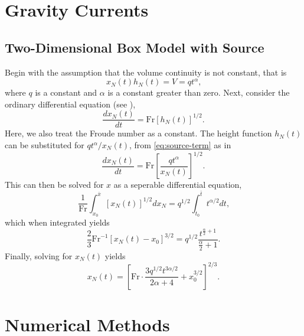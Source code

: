 


	\tableofcontents
	
	\chapter{Gravity Currents}
	
	\section{Two-Dimensional Box Model with Source}
	Begin with the assumption that the volume continuity is not constant, that is 
	\begin{equation}\label{eq:source-term}
		x_N(t)h_N(t) = V = qt^{\alpha}\text{,}
	\end{equation}
	where \(q\) is a constant and \(\alpha\) is a constant greater than zero. Next, consider the ordinary differential equation (see \cite[60]{Ungarish2009}), 
	\begin{equation}\label{eq:box-model}
		\frac{dx_N(t)}{dt} = \text{Fr}\left[h_N(t)\right]^{1/2}\text{.}
	\end{equation}
	Here, we also treat the Froude number as a constant. The height function \(h_N(t)\) can be substituted for \(qt^{\alpha} / x_N(t)\), from \eqref{eq:source-term} as in
	\begin{equation*}
		\frac{dx_N(t)}{dt} = \text{Fr}\left[\frac{qt^{\alpha}}{x_N(t)}\right]^{1/2}\text{.}
	\end{equation*}
	This can then be solved for \(x\) as a seperable differential equation,
	\begin{equation*}
		\frac{1}{\text{Fr}}\int_{x_0}^{\bar{x}} \left[x_N(t)\right]^{1/2} dx_N = q^{1/2} \int_{t_0}^{\bar{t}} t^{\alpha/2} dt\text{,}
	\end{equation*}
	which when integrated yields
	\begin{equation*}
		\frac{2}{3}\text{Fr}^{-1}\left[x_N(t) - x_0\right]^{3/2} = q^{1/2}\frac{t^{\frac{\alpha}{2} +1}}{\frac{\alpha}{2} + 1}\text{.}
	\end{equation*}
	Finally, solving for \(x_N(t)\) yields
	\begin{equation*}
		x_N(t) = \left[\text{Fr}\cdot\frac{3q^{1/2}t^{3\alpha/2 }}{2\alpha + 4} + x_0^{3/2}\right]^{2/3}\text{.}
	\end{equation*}

	\chapter{Numerical Methods}

